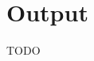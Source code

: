 \documentclass[british]{article}
\newcommand\prv{bc}
\newcommand\m[1]{\texttt{#1}}
\newenvironment{code}{\captionsetup{type=listing}}{}
\newcommand\scref[1]{Source-Code~\ref{code:#1}}
\begin{document}
\section{Output}

TODO
%
%
%
\end{document}
